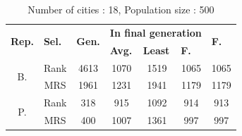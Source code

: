 \documentclass[10pt,a4paper,openbib]{article}
\begin{document}
\begin{multicols}{2}
\begin{table}[H]
\centering
\begin{tabular}{|c|c|c|c|c|c|c|}
\hline
\multicolumn{1}{|l|}{\multirow{2}{*}{\textbf{Rep.}}} & \multicolumn{1}{l|}{\multirow{2}{*}{\textbf{Sel.}}} & \multicolumn{1}{l|}{\multirow{2}{*}{\textbf{Gen.}}} & \multicolumn{3}{c|}{\textbf{In final generation}}                                                                & \multicolumn{1}{l|}{\multirow{2}{*}{\textbf{F.}}} \\ \cline{4-6}
\multicolumn{1}{|l|}{}                               & \multicolumn{1}{l|}{}                               & \multicolumn{1}{l|}{}                               & \multicolumn{1}{l|}{\textbf{Avg.}} & \multicolumn{1}{l|}{\textbf{Least}} & \multicolumn{1}{l|}{\textbf{F.}} & \multicolumn{1}{l|}{}                                  \\ \hline
\multirow{2}{*}{B.}                                  & Rank                                                & 4613                                                & 1070                               & 1519                                & 1065                                  & 1065                                                   \\ \cline{2-7} 
                                                     & MRS                                                & 1961                                                & 1231                               & 1941                                & 1179                                  & 1179                                                   \\ \hline
\multirow{2}{*}{P.}                                  & Rank                                                & 318                                                 & 915                                & 1092                                 & 914                                   & 913                                                    \\ \cline{2-7} 
                                                     & MRS                                                & 400                                                 & 1007                                & 1361                                & 997                                   & 997                                                    \\ \hline
\end{tabular}
\caption{Number of cities : 18, Population size : 500}
\label{table:18cities}
\end{table}


\end{multicols}
\end{document}
